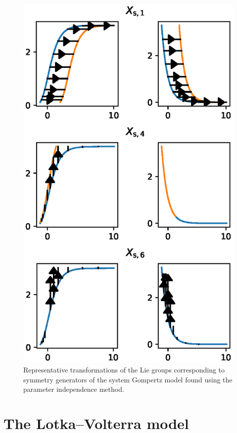 \begin{figure}
  \centering
  \includegraphics[height=.48\textheight]{images/gompertz-system-param}
  \caption{Representative transformations of the Lie groups corresponding to symmetry generators of the system Gompertz model found using the parameter independence method.}
  \label{fig:gompertz-system-param}
\end{figure}

\section{The Lotka--Volterra model}

